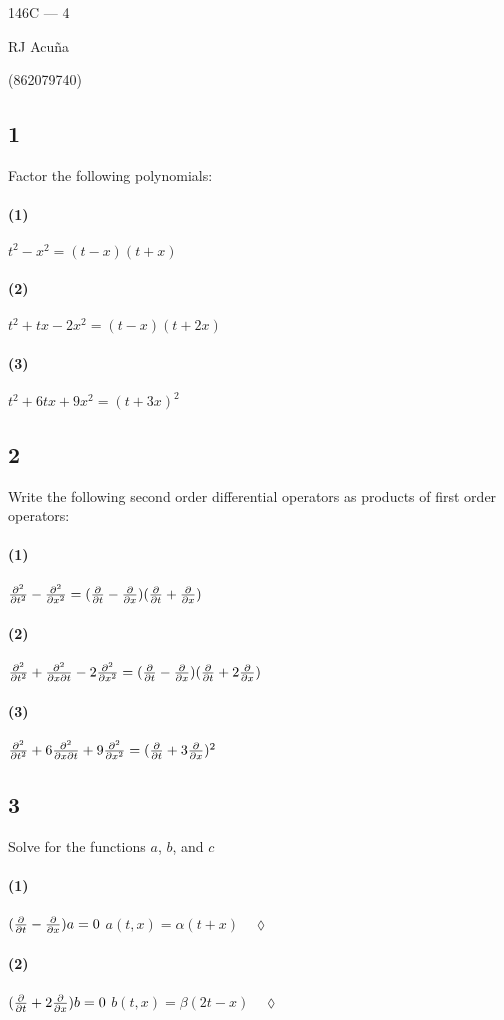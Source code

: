 \documentclass{article}
\begin{document}
\begin{center}
  146C --- 4

  RJ Acuña

  (862079740)
\end{center}\vspace{1.618em}
\subsection*{1} Factor the following polynomials:
\paragraph{(1)} $t^2-x^2 = (t-x)(t+x)$
\paragraph{(2)} $t^2 +tx -2x^2 = (t-x)(t+2x)$
\paragraph{(3)} $t^2 +6tx +9x^2 = (t+3x)^2$
\subsection*{2} Write the following second order differential operators as products of first order
operators:
\paragraph{(1)} $\pdv[2]{}{t}-\pdv[2]{}{x} = (\pdv{t}-\pdv{x})(\pdv{t}+\pdv{x})$
\paragraph{(2)} $\pdv[2]{t} +\pdv{}{x}{t} -2\pdv[2]{}{x} = (\pdv{t}-\pdv{x})(\pdv{t}+2\pdv{x})$
\paragraph{(3)} $\pdv[2]{}{t} +6\pdv{}{x}{t} +9\pdv[2]{}{x} = (\pdv{t}+3\pdv{x})^2$
\subsection*{3} Solve for the functions $a$, $b$, and $c$
\paragraph{(1)} $(\pdv{t}-\pdv{x})a = 0$  $a(t,x) =
\alpha(t+x)\quad \lozenge$
\paragraph{(2)} $(\pdv{t}+2\pdv{x})b = 0$  $b(t,x) =
\beta(2t-x)\quad \lozenge$
\end{document}

